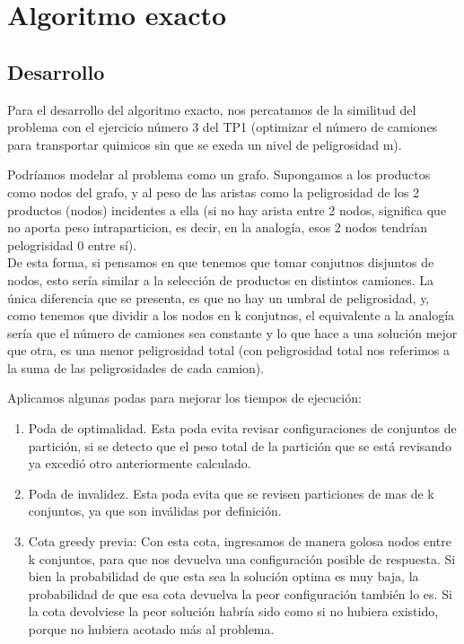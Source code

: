\section{Algoritmo exacto}
\subsection{Desarrollo}
Para el desarrollo del algoritmo exacto, nos percatamos de la similitud del problema con el ejercicio número 3 del TP1 (optimizar el número de camiones para transportar quimicos sin que se exeda un nivel de peligrosidad m).

Podríamos modelar al problema como un grafo.
Supongamos a los productos como nodos del grafo, y al peso de las aristas como la peligrosidad de los 2 productos (nodos) incidentes a ella (si no hay arista entre 2 nodos, significa que no aporta peso intraparticion, es decir, en la analogía, esos 2 nodos tendrían pelogrisidad 0 entre sí).\\
De esta forma, si pensamos en que tenemos que tomar conjutnos disjuntos de nodos, esto sería similar a la selección de productos en distintos camiones. La única diferencia que se presenta, es que no hay un umbral de peligrosidad, y, como tenemos que dividir a los nodos en k conjutnos, el equivalente a la analogía sería que el número de camiones sea constante y lo que hace a una solución mejor que otra, es una menor peligrosidad total (con peligrosidad total nos referimos a la suma de las peligrosidades de cada camion).

Aplicamos algunas podas para mejorar los tiempos de ejecución:
\begin{enumerate}
\item Poda de optimalidad. Esta poda evita revisar configuraciones de conjuntos de partición, si se detecto que el peso total de la partición que se está revisando ya excedió otro anteriormente calculado.
\item Poda de invalidez. Esta poda evita que se revisen particiones de mas de k conjuntos, ya que son inválidas por definición.
\item Cota greedy previa: Con esta cota, ingresamos de manera golosa nodos entre k conjuntos, para que nos devuelva una configuración posible de respuesta. Si bien la probabilidad de que esta sea la solución optima es muy baja, la probabilidad de que esa cota devuelva la peor configuración también lo es. Si la cota devolviese la peor solución habría sido como si no hubiera existido, porque no hubiera acotado más al problema.
\end{enumerate}

